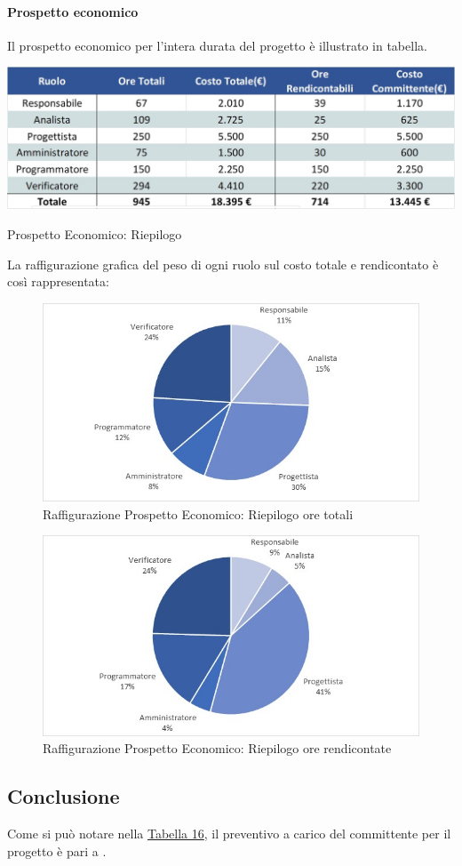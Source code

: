 \paragraph{Prospetto economico}
Il prospetto economico per l'intera durata del progetto è illustrato in tabella. 
\begin{table}[H]
	\centerline{\includegraphics[scale=0.6]{img/Preventivo/TotaleEconomico.jpg}}\label{Totale}
	\caption{Prospetto Economico: Riepilogo}
	\clearpage
\end{table}
\newpage
La raffigurazione grafica del peso di ogni ruolo sul costo totale e rendicontato è così rappresentata: 
\begin{figure}[H]
	\centerline{\includegraphics[scale=0.9]{img/Preventivo/Torte/Totale.jpg}}
	\caption{Raffigurazione Prospetto Economico: Riepilogo ore totali}
	\clearpage
\end{figure}
\begin{figure}[H]
	\centerline{\includegraphics[scale=0.9]{img/Preventivo/Torte/TotaleRendicontato.jpg}}
	\caption{Raffigurazione Prospetto Economico: Riepilogo ore rendicontate}
	\clearpage
\end{figure}

\subsection{Conclusione}
Come si può notare nella \hyperref[Totale]{Tabella 16}, il preventivo a carico del committente per il progetto è pari a .
